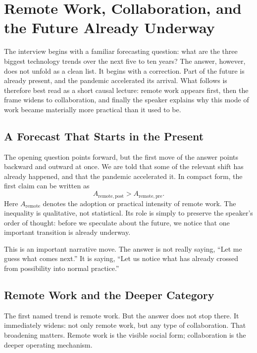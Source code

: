\chapter{Remote Work, Collaboration, and the Future Already Underway}

The interview begins with a familiar forecasting question: what are the three biggest technology trends over the next five to ten years? The answer, however, does not unfold as a clean list. It begins with a correction. Part of the future is already present, and the pandemic accelerated its arrival. What follows is therefore best read as a short causal lecture: remote work appears first, then the frame widens to collaboration, and finally the speaker explains why this mode of work became materially more practical than it used to be.

\section{A Forecast That Starts in the Present}

The opening question points forward, but the first move of the answer points backward and outward at once. We are told that some of the relevant shift has already happened, and that the pandemic accelerated it. In compact form, the first claim can be written as
\begin{equation}
A_{\mathrm{remote},\mathrm{post}} > A_{\mathrm{remote},\mathrm{pre}} .
\end{equation}
Here \(A_{\mathrm{remote}}\) denotes the adoption or practical intensity of remote work. The inequality is qualitative, not statistical. Its role is simply to preserve the speaker's order of thought: before we speculate about the future, we notice that one important transition is already underway.

This is an important narrative move. The answer is not really saying, ``Let me guess what comes next.'' It is saying, ``Let us notice what has already crossed from possibility into normal practice.''

\section{Remote Work and the Deeper Category}

The first named trend is remote work. But the answer does not stop there. It immediately widens: not only remote work, but any type of collaboration. That broadening matters. Remote work is the visible social form; collaboration is the deeper operating mechanism.

